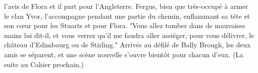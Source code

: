 l'avis de Flora et il part pour l'Angleterre. Fergus, bien que très-occupé à armer le clan Yvor, l'accompagne pendant une partie du chemin, enflammant sa tête et son cœur pour les Stuarts et pour Flora. "Vous allez tomber dans de mauvaises mains lui dit-il, et vous verrez qu'il me faudra aller assiéger, pour vous délivrer, le château d'Edimbourg ou de Stirling." Arrivés au défilé de Bally Brough, les deux amis se séparent, et une scène nouvelle s'ouvre bientôt pour chacun d'eux.
(La suite au Cahier prochain.)